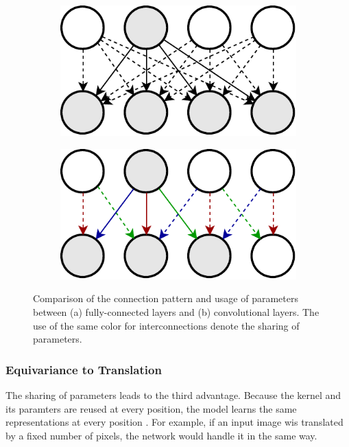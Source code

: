 \begin{figure}[htpb]
\centering
\begin{subfigure}{0.5\textwidth}
  \centering
  \includegraphics[width=.8\linewidth]{figures/fc2.pdf}
  \caption{}
  \label{fig:conv_vs_fc_fc}
\end{subfigure}%
\begin{subfigure}{0.5\textwidth}
  \centering
  \includegraphics[width=0.8\linewidth]{figures/param_share.pdf}
  \caption{}
  \label{fig:conv_vs_fc_conv}
\end{subfigure}
\caption[Sparse connections and parameter sharing in a CNN]{Comparison of the connection pattern and usage of parameters between (a) fully-connected layers and (b) convolutional layers. The use of the same color for interconnections denote the sharing of parameters.}
\label{fig:conv_vs_fc}
\end{figure}

\subsubsection*{Equivariance to Translation}
The sharing of parameters leads to the third advantage. Because the kernel and its paramters are reused at every position, the model learns the same representations at every position \parencite[p. 339]{deep_learning}. For example, if an input image wis translated by a fixed number of pixels, the network would handle it in the same way.

